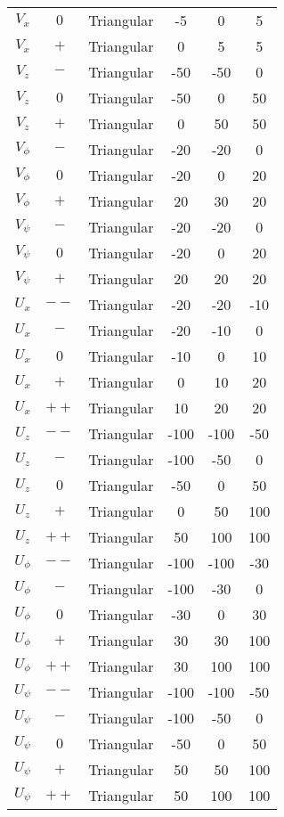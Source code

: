 \begin{center}
\begin{longtable}{|c|c|c|c|c|c|}
        $V_x$ & $0$  & Triangular & -5 & 0 & 5 \\
        $V_x$ & $+$ & Triangular & 0 & 5 & 5 \\
        \hline
        $V_{z}$ & $-$  & Triangular & -50 & -50 & 0 \\
        $V_{z}$ & $0$  & Triangular & -50 & 0 & 50 \\
        $V_{z}$ & $+$  & Triangular & 0 & 50 & 50 \\
        \hline
        $V_{\phi}$ & $-$  & Triangular & -20 & -20 & 0 \\
        $V_{\phi}$ & $0$  & Triangular & -20 & 0 & 20 \\
        $V_{\phi}$ & $+$  & Triangular & 20 & 30 & 20 \\
        \hline
        $V_{\psi}$ & $-$  & Triangular & -20 & -20 & 0 \\
        $V_{\psi}$ & $0$  & Triangular & -20 & 0 & 20 \\
        $V_{\psi}$ & $+$  & Triangular & 20 & 20 & 20 \\
        \hline
        $U_x$ & $--$ & Triangular & -20 & -20 & -10 \\
        $U_x$ & $-$  & Triangular & -20 & -10 & 0 \\
        $U_x$ & $0$  & Triangular & -10 & 0 & 10 \\
        $U_x$ & $+$  & Triangular & 0 & 10 & 20 \\
        $U_x$ & $++$ & Triangular & 10 & 20 & 20 \\
        \hline
        $U_{z}$ & $--$ & Triangular & -100 & -100 & -50 \\
        $U_{z}$ & $-$  & Triangular & -100 & -50 & 0 \\
        $U_{z}$ & $0$  & Triangular & -50 & 0 & 50 \\
        $U_{z}$ & $+$  & Triangular & 0 & 50 & 100 \\
        $U_{z}$ & $++$ & Triangular & 50 & 100 & 100 \\
        \hline
        $U_{\phi}$ & $--$ & Triangular & -100 & -100 & -30 \\
        $U_{\phi}$ & $-$  & Triangular & -100 & -30 & 0 \\
        $U_{\phi}$ & $0$  & Triangular & -30 & 0 & 30 \\
        $U_{\phi}$ & $+$  & Triangular & 30 & 30 & 100 \\
        $U_{\phi}$ & $++$ & Triangular & 30 & 100 & 100 \\
        \hline
        $U_{\psi}$ & $--$ & Triangular & -100 & -100 & -50 \\
        $U_{\psi}$ & $-$  & Triangular & -100 & -50 & 0 \\
        $U_{\psi}$ & $0$  & Triangular & -50 & 0 & 50 \\
        $U_{\psi}$ & $+$  & Triangular & 50 & 50 & 100 \\
        $U_{\psi}$ & $++$ & Triangular & 50 & 100 & 100 \\
        \hline
    \end{longtable}
\end{center}
\vspace{-1.5cm}